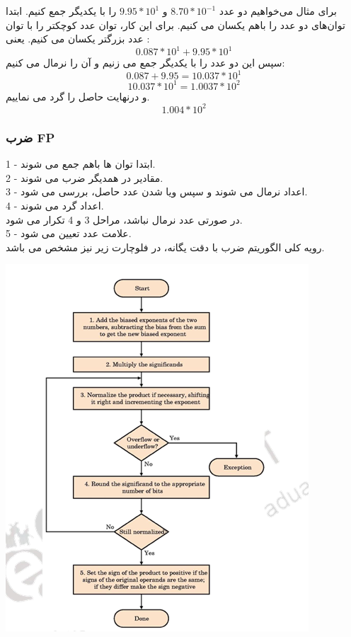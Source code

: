 \documentclass[12pt,titlepage,a4page , tikz , multi,table , svgnames,xcdraw]{article}
\begin{document}
برای مثال می‌خواهیم دو عدد 
$8.70 * 10^{-1}$
و 
$9.95*10^1$
را با یکدیگر جمع کنیم. ابتدا توان‌های دو عدد را باهم یکسان می کنیم. برای این کار، توان عدد کوچکتر را با توان عدد بزرگتر یکسان می کنیم. یعنی :
$$0.087*10^1 + 9.95*10^1$$
سپس این دو عدد را با یکدیگر جمع می زنیم و آن را نرمال می کنیم:
$$0.087 + 9.95 = 10.037 * 10^1$$
$$10.037*10^1 = 1.0037*10^2$$
و درنهایت حاصل را گرد می نماییم.
$$1.004 * 10^2$$

\cite{Floating_Point_Operationss} \cite{FPArithmatic}

\subsubsection{ضرب FP}
1 - ابتدا توان ها باهم جمع می شوند. \\
2 - مقادیر 
 در همدیگر ضرب می شوند. \\
3 - اعداد نرمال می شوند و سپس 
 ویا 
 شدن عدد حاصل، بررسی می شود. \\
4 - اعداد گرد می شوند. \\
در صورتی عدد نرمال نباشد، مراحل 3 و 4 تکرار می شود. \\
5 - علامت عدد تعیین می شود. \\
	رویه کلی الگوریتم ضرب 
     با دقت یگانه، در فلوچارت زیر نیز مشخص می باشد.

\begin{center}
\includegraphics[scale=0.8]
    {Images/Introduction/Floating_point_mult.png}\\
\end{center}
\end{document}
